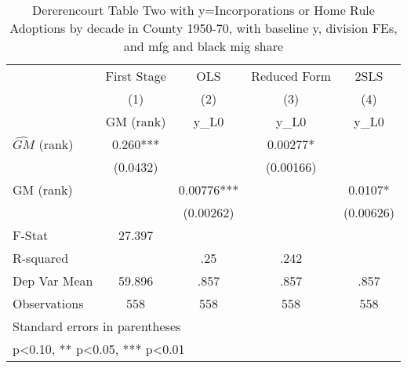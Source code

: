 \begin{table}[htbp]\centering
\def\sym#1{\ifmmode^{#1}\else\(^{#1}\)\fi}
\caption{Dererencourt Table Two with y=Incorporations or Home Rule Adoptions by decade in County 1950-70, with baseline y, division FEs, and mfg and black mig share}
\begin{tabular}{l*{4}{c}}
\toprule
                    & First Stage   &         OLS   &Reduced Form   &        2SLS   \\
                    &\multicolumn{1}{c}{(1)}&\multicolumn{1}{c}{(2)}&\multicolumn{1}{c}{(3)}&\multicolumn{1}{c}{(4)}\\
                    &\multicolumn{1}{c}{GM  (rank)}&\multicolumn{1}{c}{y\_L0}&\multicolumn{1}{c}{y\_L0}&\multicolumn{1}{c}{y\_L0}\\
\midrule
$\hat{GM}$ (rank)   &       0.260***&               &     0.00277*  &               \\
                    &    (0.0432)   &               &   (0.00166)   &               \\
\addlinespace
GM  (rank)          &               &     0.00776***&               &      0.0107*  \\
                    &               &   (0.00262)   &               &   (0.00626)   \\
\midrule
F-Stat              &      27.397   &               &               &               \\
R-squared           &               &         .25   &        .242   &               \\
Dep Var Mean        &      59.896   &        .857   &        .857   &        .857   \\
Observations        &         558   &         558   &         558   &         558   \\
\bottomrule
\multicolumn{5}{l}{\footnotesize Standard errors in parentheses}\\
\multicolumn{5}{l}{\footnotesize * p<0.10, ** p<0.05, *** p<0.01}\\
\end{tabular}
\end{table}
